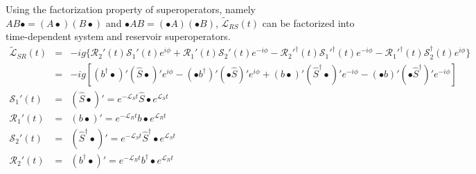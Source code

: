Using the factorization property of superoperators, namely $AB\bullet = (A \bullet ) ( B \bullet )$ and $\bullet A B = ( \bullet A ) ( \bullet B )$, $\mathcal{\tilde{L}}_{RS}(t)$ can be factorized into time-dependent system and reservoir superoperators.
\begin{eqnarray}
\mathcal{\tilde{L}}_{SR}(t) & = & -ig \lbrace \mathcal{R}_2'(t) \mathcal{S}_1'(t) e^{ i \phi } + \mathcal{R}_1'(t) \mathcal{S}_2'(t) e^{- i \phi} - \mathcal{R}_2'^{\dagger} (t) \mathcal{S}_1'^{\dagger}(t) e^{- i \phi} - \mathcal{R}_1'^{\dagger}(t) \mathcal{S}_2^{\dagger}(t) e^{i \phi }  \rbrace \nonumber \\
 & = & - i g \left[ (b^{\dagger} \bullet )' ( \hat{S} \bullet ) ' e^{i \phi } - ( \bullet b^{\dagger} )' ( \bullet \hat{S} )' e^{ i \phi } + ( b \bullet )' ( \hat{S}^{\dagger} \bullet )' e^{ - i \phi } - (\bullet b)' (\bullet \hat{S}^{\dagger} )' e^{- i \phi } \right] \nonumber \\
\mathcal{S}_1'(t) & = & ( \hat{S} \bullet)'= e^{-  \mathcal{L}_S t } \hat{S} \bullet e^{  \mathcal{L}_S t } \nonumber \\
\mathcal{R}_1'(t) & = & (b \bullet)' = e^{- \mathcal{L}_R t } b \bullet e^{\mathcal{L}_R t} \nonumber \\
\mathcal{S}_2'(t) & = & (\hat{S}^{\dagger} \bullet)' =  e^{- \mathcal{L}_S t } \hat{S}^{\dagger} \bullet e^{ \mathcal{L}_S t } \nonumber \\
\mathcal{R}_2'(t) &=& (b^{\dagger} \bullet )' = e^{-\mathcal{L}_R t } b^{\dagger} \bullet e^{\mathcal{L}_R t } \nonumber 
\end{eqnarray}

